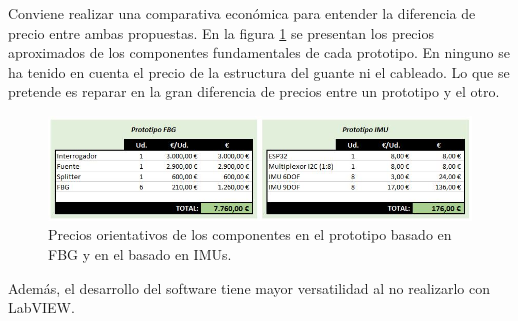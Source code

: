 	Conviene realizar una comparativa económica para entender la diferencia de precio entre ambas propuestas. En la figura \ref{fig:precioCompara} se presentan los precios aproximados de los componentes fundamentales de cada prototipo. En ninguno se ha tenido en cuenta el precio de la estructura del guante ni el cableado. Lo que se pretende es reparar en la gran diferencia de precios entre un prototipo y el otro.
	
	\begin{figure}[H]
		\centering
		\includegraphics[width=\textwidth]{./img/precios2}
		\caption{Precios orientativos de los componentes en el prototipo basado en FBG y en el basado en IMUs. } 
		\label{fig:precioCompara}
	\end{figure} 
	
	Además, el desarrollo del software tiene mayor versatilidad al no realizarlo con LabVIEW.

